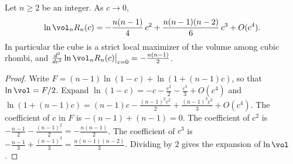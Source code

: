 \begin{theorem}\label{thm:main}
Let $n\ge2$ be an integer. As $c\to0$,
\[
\ln\vol_nR_n(c)=-\frac{n(n-1)}{4}\,c^2+\frac{n(n-1)(n-2)}{6}\,c^3+O(c^4).
\]
In particular the cube is a strict local maximizer of the volume among cubic rhombi, and $\frac{d^2}{dc^2}\ln\vol_nR_n(c)\big|_{c=0}=-\frac{n(n-1)}{2}$.
\end{theorem}
\begin{proof}
Write $F=(n-1)\ln(1-c)+\ln(1+(n-1)c)$, so that $\ln\vol=F/2$.
Expand $\ln(1-c)=-c-\frac{c^2}{2}-\frac{c^3}{3}+O(c^4)$ and $\ln(1+(n-1)c)=(n-1)c-\frac{(n-1)^2c^2}{2}+\frac{(n-1)^3c^3}{3}+O(c^4)$.
The coefficient of $c$ in $F$ is $-(n-1)+(n-1)=0$.
The coefficient of $c^2$ is $-\frac{n-1}{2}-\frac{(n-1)^2}{2}=-\frac{n(n-1)}{2}$.
The coefficient of $c^3$ is $-\frac{n-1}{3}+\frac{(n-1)^3}{3}=\frac{n(n-1)(n-2)}{3}$.
Dividing by $2$ gives the expansion of $\ln\vol$.
\end{proof}
